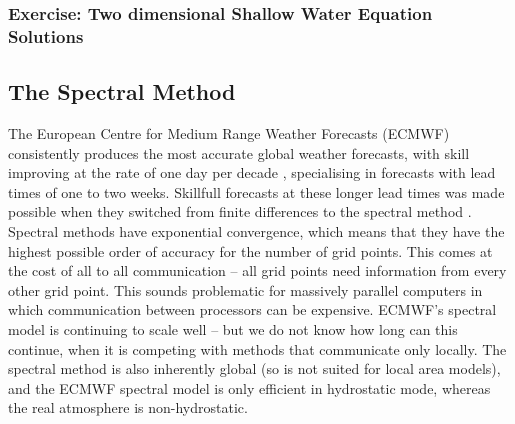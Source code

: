 \subsubsection{Exercise: Two dimensional Shallow Water Equation Solutions}


\subsection{The Spectral Method}

The European Centre for Medium Range Weather Forecasts (ECMWF) consistently
produces the most accurate global weather forecasts, with skill improving
at the rate of one day per decade \citep{HJV+24}, specialising in
forecasts with lead times of one to two weeks. Skillfull forecasts
at these longer lead times was made possible when they switched from
finite differences to the spectral method \citep{GJ82,SBJ+89}. Spectral
methods have exponential convergence, which means that they have the
highest possible order of accuracy for the number of grid points.
This comes at the cost of all to all communication -- all grid points
need information from every other grid point. This sounds problematic
for massively parallel computers in which communication between processors
can be expensive. ECMWF's spectral model is continuing to scale well
-- but we do not know how long can this continue, when it is competing
with methods that communicate only locally. The spectral method is
also inherently global (so is not suited for local area models), and
the ECMWF spectral model is only efficient in hydrostatic mode, whereas
the real atmosphere is non-hydrostatic. 

